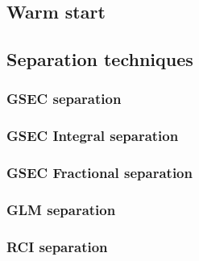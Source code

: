 \subsection{Warm start}

\subsection{Separation techniques}

\subsubsection{GSEC separation}

\subsubsection{GSEC Integral separation}

\subsubsection{GSEC Fractional separation}

\subsubsection{GLM separation}

\subsubsection{RCI separation}
